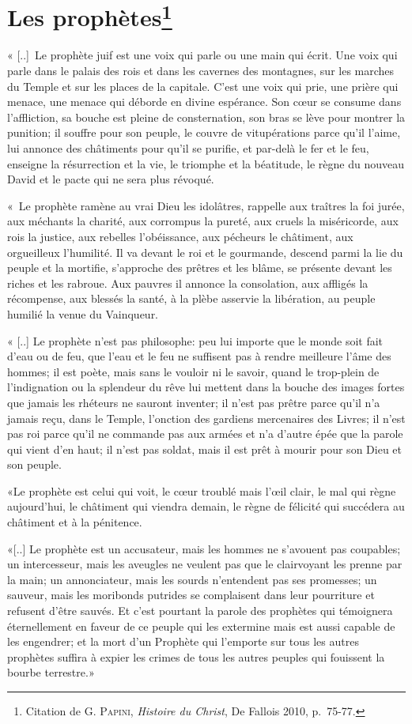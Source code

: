 \section*{Les prophètes\footnote{Citation de \textsc{G. Papini}, \textit{Histoire du Christ}, De Fallois 2010, p.~75-77.}}
\decalage « [..]~Le prophète juif est une voix qui parle ou une main qui écrit. Une voix qui parle dans le palais des rois et dans les cavernes des montagnes, sur les marches du Temple et sur les places de la capitale. C'est une voix qui prie, une prière qui menace, une menace qui déborde en divine espérance. Son cœur se consume dans l'affliction, sa bouche est pleine de consternation, son bras se lève pour montrer la punition; il souffre pour son peuple, le couvre de vitupérations parce qu'il l'aime, lui annonce des châtiments pour qu'il se purifie, et par-delà le fer et le feu, enseigne la résurrection et la vie, le triomphe et la béatitude, le règne du nouveau David et le pacte qui ne sera plus révoqué.\par
\decalage «~Le prophète ramène au vrai Dieu les idolâtres, rappelle aux traîtres la foi jurée, aux méchants la charité, aux corrompus la pureté, aux cruels la miséricorde, aux rois la justice, aux rebelles l'obéissance, aux pécheurs le châtiment, aux orgueilleux l'humilité. Il va devant le roi et le gourmande, descend parmi la lie du peuple et la mortifie, s'approche des prêtres et les blâme, se présente devant les riches et les rabroue. Aux pauvres il annonce la consolation, aux affligés la récompense, aux blessés la santé, à la plèbe asservie la libération, au peuple humilié la venue du Vainqueur.\par
\decalage « [..] Le prophète n'est pas philosophe: peu lui importe que le monde soit fait d'eau ou de feu, que l'eau et le feu ne suffisent pas à rendre meilleure l'âme des hommes; il est poète, mais sans le vouloir ni le savoir, quand le trop-plein de l'indignation ou la splendeur du rêve lui mettent dans la bouche des images fortes que jamais les rhéteurs ne sauront inventer; il n'est pas prêtre parce qu'il n'a jamais reçu, dans le Temple, l'onction des gardiens mercenaires des Livres; il n'est pas roi parce qu'il ne commande pas aux armées et n'a d'autre épée que la parole qui vient d'en haut; il n'est pas soldat, mais il est prêt à mourir pour son Dieu et son peuple. \par
\decalage «Le prophète est celui qui voit, le cœur troublé mais l'œil clair, le mal qui règne aujourd'hui, le châtiment qui viendra demain, le règne de félicité qui succédera au châtiment et à la pénitence.\par
\decalage «[..] Le prophète est un accusateur, mais les hommes ne s'avouent pas coupables; un intercesseur, mais les aveugles ne veulent pas que le clairvoyant les prenne par la main; un annonciateur, mais les sourds n'entendent pas ses promesses; un sauveur, mais les moribonds putrides se complaisent dans leur pourriture et refusent d'être sauvés. Et c'est pourtant la parole des prophètes qui témoignera éternellement en faveur de ce peuple qui les extermine mais est aussi capable de les engendrer; et la mort d'un Prophète qui l'emporte sur tous les autres prophètes suffira à expier les crimes de tous les autres peuples qui fouissent la bourbe terrestre.»\par
